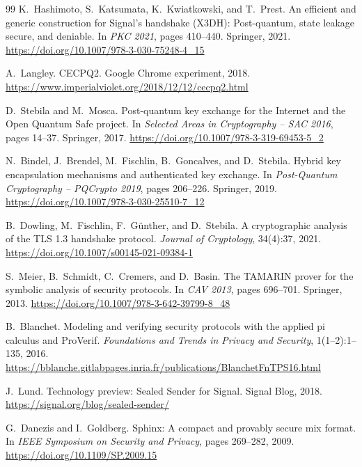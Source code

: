 \documentclass[preprint,12pt]{elsarticle}
\theoremstyle{definition}
\begin{document}
\begin{thebibliography}{99}
K.~Hashimoto, S.~Katsumata, K.~Kwiatkowski, and T.~Prest.
\newblock An efficient and generic construction for Signal's handshake (X3DH): Post-quantum, state leakage secure, and deniable.
\newblock In \emph{PKC 2021}, pages 410--440. Springer, 2021.
\newblock \url{https://doi.org/10.1007/978-3-030-75248-4_15}

A.~Langley.
\newblock CECPQ2.
\newblock Google Chrome experiment, 2018.
\newblock \url{https://www.imperialviolet.org/2018/12/12/cecpq2.html}

D.~Stebila and M.~Mosca.
\newblock Post-quantum key exchange for the Internet and the Open Quantum Safe project.
\newblock In \emph{Selected Areas in Cryptography -- SAC 2016}, pages 14--37. Springer, 2017.
\newblock \url{https://doi.org/10.1007/978-3-319-69453-5_2}

N.~Bindel, J.~Brendel, M.~Fischlin, B.~Goncalves, and D.~Stebila.
\newblock Hybrid key encapsulation mechanisms and authenticated key exchange.
\newblock In \emph{Post-Quantum Cryptography -- PQCrypto 2019}, pages 206--226. Springer, 2019.
\newblock \url{https://doi.org/10.1007/978-3-030-25510-7_12}

B.~Dowling, M.~Fischlin, F.~G{\"u}nther, and D.~Stebila.
\newblock A cryptographic analysis of the {TLS} 1.3 handshake protocol.
\newblock \emph{Journal of Cryptology}, 34(4):37, 2021.
\newblock \url{https://doi.org/10.1007/s00145-021-09384-1}

S.~Meier, B.~Schmidt, C.~Cremers, and D.~Basin.
\newblock The {TAMARIN} prover for the symbolic analysis of security protocols.
\newblock In \emph{CAV 2013}, pages 696--701. Springer, 2013.
\newblock \url{https://doi.org/10.1007/978-3-642-39799-8_48}

B.~Blanchet.
\newblock Modeling and verifying security protocols with the applied pi calculus and {ProVerif}.
\newblock \emph{Foundations and Trends in Privacy and Security}, 1(1--2):1--135, 2016.
\newblock \url{https://bblanche.gitlabpages.inria.fr/publications/BlanchetFnTPS16.html}

J.~Lund.
\newblock Technology preview: Sealed Sender for Signal.
\newblock Signal Blog, 2018.
\newblock \url{https://signal.org/blog/sealed-sender/}

G.~Danezis and I.~Goldberg.
\newblock Sphinx: A compact and provably secure mix format.
\newblock In \emph{IEEE Symposium on Security and Privacy}, pages 269--282, 2009.
\newblock \url{https://doi.org/10.1109/SP.2009.15}


\end{thebibliography}
\end{document}
